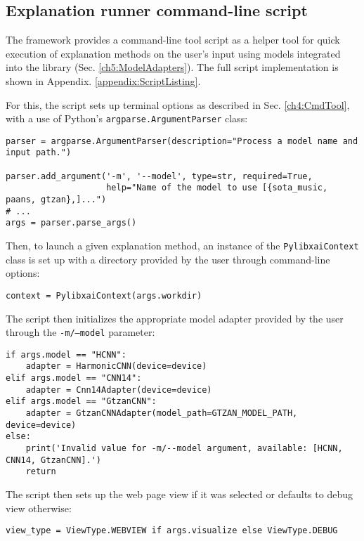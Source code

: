 \documentclass[
    bindingoffset=5mm,  %
    footnoteindent=3mm, %
    hyphenation=true    %
]{src/wut-thesis}
\begin{document}
\clearpage %
\subsection{Explanation runner command-line script}

The framework provides a command-line tool script as a helper tool for quick execution
of explanation methods on the user’s input using models integrated into the library
(Sec. \ref{ch5:ModelAdapters}). The full script implementation
is shown in Appendix. \ref{appendix:ScriptListing}.

For this, the script sets up terminal options as described in Sec. \ref{ch4:CmdTool}, with a use of Python's \texttt{argparse.ArgumentParser} class:
\begin{verbatim}
parser = argparse.ArgumentParser(description="Process a model name and input path.")
    
parser.add_argument('-m', '--model', type=str, required=True,
                    help="Name of the model to use [{sota_music, paans, gtzan},]...")
# ...
args = parser.parse_args()
\end{verbatim}

Then, to launch a given explanation method, an instance of the \texttt{PylibxaiContext} class
is set up with a directory provided by the user through command-line options:

\begin{verbatim}
context = PylibxaiContext(args.workdir)
\end{verbatim}

The script then initializes the appropriate model adapter provided by the user through the \texttt{-m/--model} parameter: 
\begin{verbatim}
if args.model == "HCNN":
    adapter = HarmonicCNN(device=device)
elif args.model == "CNN14":
    adapter = Cnn14Adapter(device=device)
elif args.model == "GtzanCNN":
    adapter = GtzanCNNAdapter(model_path=GTZAN_MODEL_PATH, device=device)
else:
    print('Invalid value for -m/--model argument, available: [HCNN, CNN14, GtzanCNN].')
    return
\end{verbatim}

The script then sets up the web page view if it was selected or defaults to debug view otherwise: 
\begin{verbatim}
view_type = ViewType.WEBVIEW if args.visualize else ViewType.DEBUG
\end{verbatim}
\end{document}
